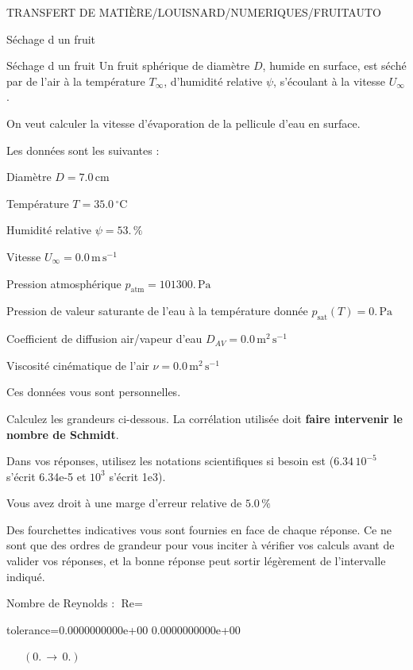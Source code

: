 \documentclass[12pt]{article}
\begin{document}
\begin{quiz}{TRANSFERT DE MATIÈRE/LOUISNARD/NUMERIQUES/FRUITAUTO}
\begin{cloze}{Séchage d un fruit}
\end{cloze} 


 \begin{cloze}{Séchage d un fruit} 
Un fruit sphérique de diamètre $D$, humide en surface, est séché par de l'air à la température $T_\infty$, d'humidité relative $\psi$, s'écoulant à la vitesse $U_\infty$.

On veut calculer la vitesse d'évaporation de la pellicule d'eau en surface.

 

Les données sont les suivantes :

 

Diamètre $D = 7.0\,  \mathrm{cm} $

Température $T = 35.0\,  \mathrm{^\circ\mathrm{C}} $

Humidité relative $\psi = 53.\, \% $

Vitesse $U_\infty = 0.0\,  \mathrm{m}\,  \mathrm{s}^{-1} $

Pression atmosphérique $p_{\text{atm}} = 101300.\,  \mathrm{Pa} $

Pression de valeur saturante de l’eau à la température donnée $p_{\text{sat}}(T) = 0.\,  \mathrm{Pa} $

Coefficient de diffusion air/vapeur d’eau $D_{AV} = 0.0\,  \mathrm{m}^{2}\,  \mathrm{s}^{-1} $

Viscosité cinématique de l’air $\nu = 0.0\,  \mathrm{m}^{2}\,  \mathrm{s}^{-1} $

Ces données vous sont personnelles.

 

Calculez les grandeurs ci-dessous. La corrélation utilisée doit \textbf{faire intervenir le nombre de Schmidt}.

Dans vos réponses, utilisez les notations scientifiques si besoin est ($6.34\, 10^{-5}$ s'écrit 6.34e-5 et $10^{3}$ s'écrit 1e3).

Vous avez droit à une marge d'erreur relative de $5.0\, \% $

Des fourchettes indicatives vous sont fournies en face de chaque réponse. Ce ne sont que des ordres de grandeur pour vous inciter à vérifier vos calculs avant de valider vos réponses, et la bonne réponse peut sortir légèrement de l'intervalle indiqué.

 

Nombre de Reynolds : $\text{Re} =  $
\begin{numerical}[points=1] 
\item[tolerance={0.0000000000e+00}] 0.0000000000e+00 
\end{numerical} 
 $\,$ 
 $ \quad (0. \, \rightarrow \, 0.) $ 


\end{cloze}
\end{quiz}
\end{document}
